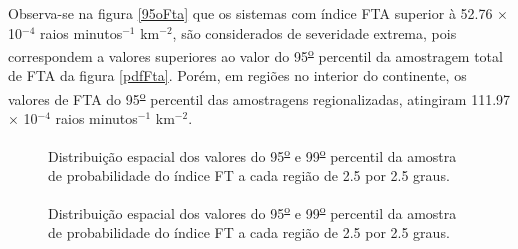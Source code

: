 Observa-se na figura \ref{95oFta} que os sistemas com índice FTA  superior à 52.76 $\times$ 10$^{-4}$ raios minutos$^{-1}$
km$^{-2}$, são considerados de severidade extrema, pois correspondem a valores superiores ao valor do 95\textsuperscript{\underline{o}} percentil da amostragem total de FTA da figura \ref{pdfFta}. Porém, em regiões no interior do continente, os valores de FTA do 95\textsuperscript{\underline{o}} percentil das amostragens regionalizadas, atingiram  111.97 $\times$ 10$^{-4}$ raios minutos$^{-1}$ km$^{-2}$.


\begin{figure}[!ht]
  \caption{Distribuição espacial dos valores do 95\textsuperscript{\underline{o}} e 99\textsuperscript{\underline{o}} percentil da amostra de probabilidade do índice FT a cada região de 2.5 por 2.5 graus.}
\label{extremosSupFTA}
\end{figure} 







\begin{figure}[!ht]
  \caption{Distribuição espacial dos valores do 95\textsuperscript{\underline{o}} e 99\textsuperscript{\underline{o}} percentil da amostra de probabilidade do índice FT a cada região de 2.5 por 2.5 graus.}
\label{extremosSupFT}
\end{figure} 


